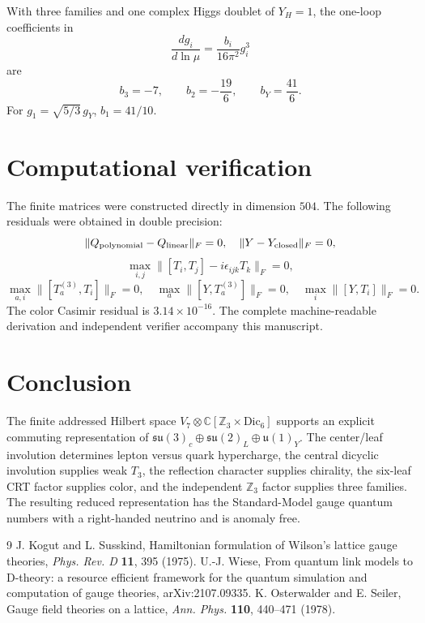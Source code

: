 \documentclass[11pt]{article}
\theoremstyle{definition}\newtheorem{definition}[theorem]{Definition}
\theoremstyle{remark}\newtheorem{remark}[theorem]{Remark}
\begin{document}
With three families and one complex Higgs doublet of $Y_H=1$, the one-loop coefficients in
\[
\frac{dg_i}{d\ln\mu}=\frac{b_i}{16\pi^2}g_i^3
\]
are
\[
\boxed{b_3=-7,\qquad b_2=-\frac{19}{6},\qquad b_Y=\frac{41}{6}.}
\]
For $g_1=\sqrt{5/3}\,g_Y$, $b_1=41/10$.

\section{Computational verification}
The finite matrices were constructed directly in dimension $504$.  The following residuals were obtained in double precision:
\[
\|Q_{\rm polynomial}-Q_{\rm linear}\|_F=0,
\quad
\|Y-Y_{\rm closed}\|_F=0,
\]
\[
\max_{i,j}\|[T_i,T_j]-i\epsilon_{ijk}T_k\|_F=0,
\]
\[
\max_{a,i}\|[T_a^{(3)},T_i]\|_F=0,
\quad
\max_a\|[Y,T_a^{(3)}]\|_F=0,
\quad
\max_i\|[Y,T_i]\|_F=0.
\]
The color Casimir residual is $3.14\times10^{-16}$.  The complete machine-readable derivation and independent verifier accompany this manuscript.

\section{Conclusion}
The finite addressed Hilbert space $V_7\otimes\mathbb C[\mathbb Z_3\times\mathrm{Dic}_6]$ supports an explicit commuting representation of $\mathfrak{su}(3)_c\oplus\mathfrak{su}(2)_L\oplus\mathfrak u(1)_Y$.  The center/leaf involution determines lepton versus quark hypercharge, the central dicyclic involution supplies weak $T_3$, the reflection character supplies chirality, the six-leaf CRT factor supplies color, and the independent $\mathbb Z_3$ factor supplies three families.  The resulting reduced representation has the Standard-Model gauge quantum numbers with a right-handed neutrino and is anomaly free.

\begin{thebibliography}{9}
 J. Kogut and L. Susskind, Hamiltonian formulation of Wilson's lattice gauge theories, \emph{Phys. Rev. D} \textbf{11}, 395 (1975).
 U.-J. Wiese, From quantum link models to D-theory: a resource efficient framework for the quantum simulation and computation of gauge theories, arXiv:2107.09335.
 K. Osterwalder and E. Seiler, Gauge field theories on a lattice, \emph{Ann. Phys.} \textbf{110}, 440--471 (1978).
\end{thebibliography}
\end{document}

